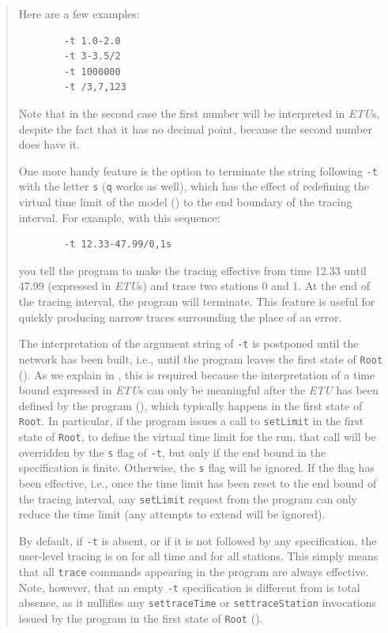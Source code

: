 \begin{quote}
Here are a few examples:
\begin{verbatim}
        -t 1.0-2.0
        -t 3-3.5/2
        -t 1000000
        -t /3,7,123
\end{verbatim}
\noindent
Note that in the second case the first number will be interpreted in
{\em ETU\/}s, despite the fact that it has no decimal point, because the
second number does have it.

One more handy feature is the option
to terminate the string following {\tt -t} with the letter
{\tt s} ({\tt q} works as well), which has the effect of redefining the
virtual time limit of the model ()
to the end boundary of the tracing interval.
For example, with this sequence:
\begin{verbatim}
        -t 12.33-47.99/0,1s
\end{verbatim}
\noindent
you tell the program to make the tracing effective from time 12.33 until
47.99 (expressed in {\em ETU\/}s) and trace two stations 0 and 1.
At the end of the tracing interval, the program will terminate.
This feature is useful for quickly producing narrow traces surrounding the
place of an error.

The interpretation of the argument string of {\tt -t} is postponed until
the network has been built, i.e., until the program leaves the first state
of {\tt Root} ().
As we explain in ,
this is required because the
interpretation of a time bound expressed in {\em ETU\/}s
can only be meaningful after the {\em ETU\/} has been defined by the program
(), which typically happens in the first state of {\tt Root}.
In particular, if the program issues a call to {\tt setLimit} in the
first state of {\tt Root}, to define the virtual time limit for the run,
that call will be overridden by the {\tt s} flag of {\tt -t},
but only if the end bound in the specification is finite.
Otherwise, the {\tt s} flag will be ignored.
If the flag has been effective, i.e., once the time limit has been reset to the
end bound of the tracing interval, any {\tt setLimit} request from the
program can only reduce the time limit (any attempts to extend will be ignored).

By default, if {\tt -t} is absent, or if it is not followed by any
specification, the user-level tracing is on for all time and for all stations.
This simply means that all {\tt trace} commands appearing in the program
are always effective.
Note, however, that an empty {\tt -t} specification is different from is
total absence, as it nullifies any {\tt settraceTime} or
{\tt settraceStation} invocations issued by the program in the first
state of {\tt Root} ().
\end{quote}

